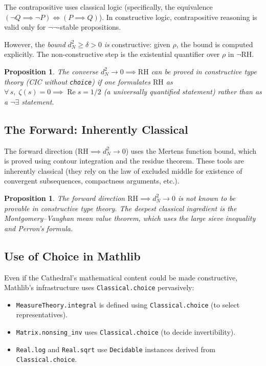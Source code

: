 \documentclass[11pt,a4paper]{article}
\theoremstyle{plain}
\newtheorem{proposition}[theorem]{Proposition}
\theoremstyle{definition}
\newcommand{\lean}[1]{\texttt{#1}}
\newcommand{\RH}{\ensuremath{\mathrm{RH}}}
\newcommand{\re}{\operatorname{Re}}
\begin{document}
The contrapositive uses classical logic (specifically, the
equivalence $(\neg Q \implies \neg P) \iff (P \implies Q)$). In
constructive logic, contrapositive reasoning is valid only for
$\neg\neg$-stable propositions.

However, the \emph{bound} $d_N^2 \geq \delta > 0$ \emph{is}
constructive: given $\rho$, the bound is computed explicitly. The
non-constructive step is the existential quantifier over $\rho$ in
$\neg\RH$.

\begin{proposition}
The converse $d_N^2 \to 0 \implies \RH$ can be proved in
constructive type theory (CIC without \lean{choice}) if one
formulates $\RH$ as $\forall\,s,\;\zeta(s) = 0 \implies
\re s = 1/2$ (a universally quantified statement) rather than
as a $\neg\exists$ statement.
\end{proposition}

\subsection{The Forward: Inherently Classical}

The forward direction ($\RH \implies d_N^2 \to 0$) uses the Mertens
function bound, which is proved using contour integration and the
residue theorem. These tools are inherently classical (they rely on
the law of excluded middle for existence of convergent subsequences,
compactness arguments, etc.).

\begin{proposition}
The forward direction $\RH \implies d_N^2 \to 0$ is not known to be
provable in constructive type theory. The deepest classical ingredient
is the Montgomery--Vaughan mean value theorem, which uses the large
sieve inequality and Perron's formula.
\end{proposition}

\subsection{Use of Choice in Mathlib}

Even if the Cathedral's mathematical content could be made constructive,
Mathlib's infrastructure uses \lean{Classical.choice} pervasively:

\begin{itemize}
  \item \lean{MeasureTheory.integral} is defined using
    \lean{Classical.choice} (to select representatives).
  \item \lean{Matrix.nonsing\_inv} uses \lean{Classical.choice}
    (to decide invertibility).
  \item \lean{Real.log} and \lean{Real.sqrt} use \lean{Decidable}
    instances derived from \lean{Classical.choice}.
\end{itemize}
\end{document}
